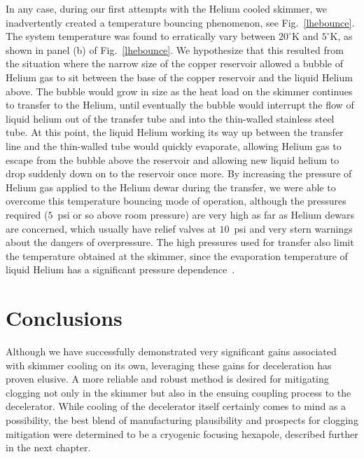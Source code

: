 In any case, during our first attempts with the Helium cooled skimmer, we inadvertently created a temperature bouncing phenomenon, see Fig.~\ref{lhebounce}.
The system temperature was found to erratically vary between $20^\circ\!$K and $5^\circ\!$K, as shown in panel (b) of Fig.~\ref{lhebounce}.
We hypothesize that this resulted from the situation where the narrow size of the copper reservoir allowed a bubble of Helium gas to sit between the base of the copper reservoir and the liquid Helium above.
The bubble would grow in size as the heat load on the skimmer continues to transfer to the Helium, until eventually the bubble would interrupt the flow of liquid helium out of the transfer tube and into the thin-walled stainless steel tube.
At this point, the liquid Helium working its way up between the transfer line and the thin-walled tube would quickly evaporate, allowing Helium gas to escape from the bubble above the reservoir and allowing new liquid helium to drop suddenly down on to the reservoir once more.
By increasing the pressure of Helium gas applied to the Helium dewar during the transfer, we were able to overcome this temperature bouncing mode of operation, although the pressures required ($5$~psi or so above room pressure) are very high as far as Helium dewars are concerned, which usually have relief valves at $10$~psi and very stern warnings about the dangers of overpressure.
The high pressures used for transfer also limit the temperature obtained at the skimmer, since the evaporation temperature of liquid Helium has a significant pressure dependence~\citep[Sec.~A]{Jensen1980}.

\section{Conclusions}

Although we have successfully demonstrated very significant gains associated with skimmer cooling on its own, leveraging these gains for deceleration has proven elusive.
A more reliable and robust method is desired for mitigating clogging not only in the skimmer but also in the ensuing coupling process to the decelerator.
While cooling of the decelerator itself certainly comes to mind as a possibility, the best blend of manufacturing plausibility and prospects for clogging mitigation were determined to be a cryogenic focusing hexapole, described further in the next chapter.

\ifx\justbeingincluded\undefined

\fi
